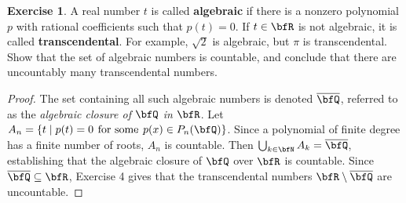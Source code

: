 \documentclass[10pt,twoside,openany]{memoir}
\theoremstyle{plain}
\theoremstyle{definition}
\newtheorem{exercise}{Exercise}
\theoremstyle{remark}
\numberwithin{equation}{section}
\begin{document}
    \begin{exercise}
        A real number $t$ is called \textbf{algebraic} if there is a nonzero polynomial $p$ with rational coefficients such that $p(t) = 0$. If $t \in \bfR$ is not algebraic, it is called \textbf{transcendental}. For example, $\sqrt{2}$ is algebraic, but $\pi$ is transcendental. Show that the set of algebraic numbers is countable, and conclude that there are uncountably many transcendental numbers.
    \end{exercise}
        \begin{proof}
            The set containing all such algebraic numbers is denoted $\overline{\bfQ}$, referred to as the \textit{algebraic closure of $\bfQ$ in $\bfR$}. Let $A_n = \{t \mid p(t) = 0\hspace{4pt}\text{for some}\hspace{4pt} p(x) \in P_n(\bfQ)\}$. Since a polynomial of finite degree has a finite number of roots, $A_n$ is countable. Then $\bigcup_{k \in \bfN} A_k = \overline{\bfQ}$, establishing that the algebraic closure of $\bfQ$ over $\bfR$ is countable. Since $\overline{\bfQ} \subseteq \bfR$, Exercise 4 gives that the transcendental numbers $\bfR \setminus \overline{\bfQ}$ are uncountable.
        \end{proof}
\end{document}
